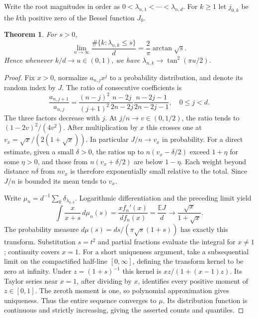 \documentclass[11pt]{article}
\newtheorem{theorem}{Theorem}
\begin{document}
Write the root magnitudes in order as $0<\lambda_{n,1}<\cdots<\lambda_{n,d}$. For $k\ge1$ let $j_{0,k}$ be the $k$th positive zero of the Bessel function $J_0$.
\begin{theorem}\label{bulk}
For $s>0$,
\[
 \lim_{n\to\infty}\frac{\#\{k:\lambda_{n,k}\le s\}}{d}
 =\frac{2}{\pi}\arctan\sqrt s .
\]
Hence whenever $k/d\to u\in(0,1)$, we have $\lambda_{n,k}\to\tan^2(\pi u/2)$.
\end{theorem}
\begin{proof}
Fix $x>0$, normalize $a_{n,j}x^j$ to a probability distribution, and denote its random index by $J$. The ratio of consecutive coefficients is
\begin{equation}\label{rat}
 \frac{a_{n,j+1}}{a_{n,j}}=
 \frac{(n-j)^2}{(j+1)^2}\frac{n-2j}{2n-2j}\frac{n-2j-1}{2n-2j-1},\quad 0\le j<d .
\end{equation}
The three factors decrease with $j$. At $j/n\to v\in(0,1/2)$, the ratio tends to $(1-2v)^2/(4v^2)$. After multiplication by $x$ this crosses one at $v_x=\sqrt{x}/(2(1+\sqrt{x}))$. In particular $J/n\to v_x$ in probability. For a direct estimate, given a small $\delta>0$, the ratios up to $n(v_x-\delta/2)$ exceed $1+\eta$ for some $\eta>0$, and those from $n(v_x+\delta/2)$ are below $1-\eta$. Each weight beyond distance $n\delta$ from $nv_x$ is therefore exponentially small relative to the total. Since $J/n$ is bounded its mean tends to $v_x$.

Write $\mu_n=d^{-1}\sum_k\delta_{\lambda_{n,k}}$. Logarithmic differentiation and the preceding limit yield
\[
 \int \frac{x}{x+s}\,d\mu_n(s)=\frac{xf_n'(x)}{df_n(x)}=\frac{\mathbb E J}{d}
 \longrightarrow\frac{\sqrt x}{1+\sqrt x}.
\]
The probability measure $d\mu(s)=ds/(\pi\sqrt{s}(1+s))$ has exactly this transform. Substitution $s=t^2$ and partial fractions evaluate the integral for $x\ne1$; continuity covers $x=1$. For a short uniqueness argument, take a subsequential limit on the compactified half-line $[0,\infty]$, defining the transform kernel to be zero at infinity. Under $z=(1+s)^{-1}$ this kernel is $xz/(1+(x-1)z)$. Its Taylor series near $x=1$, after dividing by $x$, identifies every positive moment of $z\in[0,1]$. The zeroth moment is one, so polynomial approximation gives uniqueness. Thus the entire sequence converges to $\mu$. Its distribution function is continuous and strictly increasing, giving the asserted counts and quantiles.
\end{proof}
\end{document}
